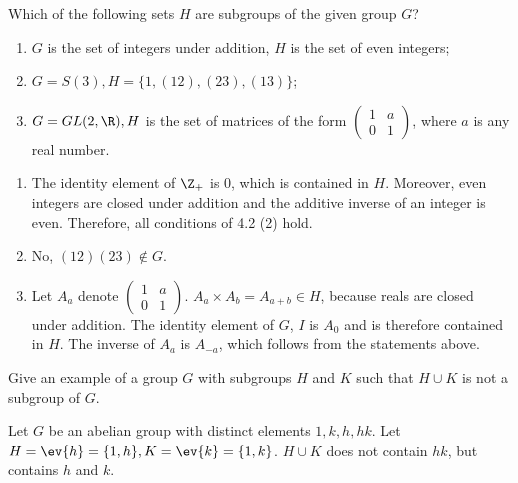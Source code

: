 \begin{exercise}
    Which of the following sets \(H\) are subgroups of the given group \(G\)?
    \begin{enumerate}
        \item \(G\) is the set of integers under addition, \(H\) is the set of even integers;
        \item \(G = S(3), H = \{1, (12), (23), (13)\}\);
        \item \(G = GL(2, \R), H\) is the set of matrices of the form \(\begin{pmatrix} 1 & a \\ 0 & 1 \end{pmatrix}\), where \(a\) is any real number.
    \end{enumerate}
\end{exercise}

\begin{solution}\itemfix
    \begin{enumerate}
        \item The identity element of \(\Z_{+}\) is \(0\), which is contained in \(H\). Moreover, even integers are closed under addition and the additive inverse of an integer is even. Therefore, all conditions of 4.2 (2) hold.
        \item No, \((12)(23) \notin G\).
        \item Let \(A_a\) denote \(\begin{pmatrix} 1 & a \\ 0 & 1 \end{pmatrix}\). \(A_a \times A_b = A_{a + b} \in H\), because reals are closed under addition. The identity element of \(G\), \(I\) is \(A_0\) and is therefore contained in \(H\). The inverse of \(A_a\) is \(A_{ - a}\), which follows from the statements above.
    \end{enumerate}
\end{solution}

\begin{exercise}
    Give an example of a group \(G\) with subgroups \(H\) and \(K\) such that \(H \cup K\) is not a subgroup of \(G\).
\end{exercise}
\begin{solution}
    Let \(G\) be an abelian group with distinct elements \(1, k, h, hk\). Let \(H = \ev{h} = \{1, h\}, K = \ev{k} = \{1, k\}\). \(H \cup K\) does not contain \(hk\), but contains \(h\) and \(k\).
\end{solution}


